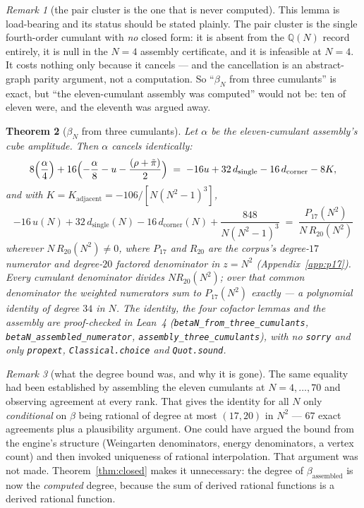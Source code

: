 \documentclass[11pt]{article}
\newtheorem{theorem}{Theorem}[section]
\theoremstyle{definition}
\theoremstyle{remark}
\newtheorem{remark}[theorem]{Remark}
\newcommand{\Q}{\mathbb{Q}}
\newcommand{\chk}[1]{}
\begin{document}
\begin{remark}[the pair cluster is the one that is never computed]
This lemma is load-bearing and its status should be stated plainly. The pair
cluster is the single fourth-order cumulant with \emph{no} closed form: it is
absent from the $\Q(N)$ record entirely, it is null in the $N=4$ assembly
certificate, and it is infeasible at $N=4$. It costs nothing only because it
cancels --- and the cancellation is an abstract-graph parity argument, not a
computation. So ``$\beta_N$ from three cumulants'' is exact, but ``the
eleven-cumulant assembly was computed'' would not be: ten of eleven were, and
the eleventh was argued away.
\end{remark}

\begin{theorem}[$\beta_N$ from three cumulants]\label{thm:beta}
Let $\alpha$ be the eleven-cumulant assembly's cube amplitude. Then $\alpha$
cancels identically:
\[
  8\Bigl(\frac{\alpha}{4}\Bigr)
  +16\Bigl(-\frac{\alpha}{8}-u-\frac{(\rho+\tilde\pi)}{2}\Bigr)
  \;=\;-16u+32\,d_{\mathrm{single}}-16\,d_{\mathrm{corner}}-8K ,
\]
and with $K=K_{\mathrm{adjacent}}=-106/[N(N^2-1)^3]$,
\begin{equation}\label{eq:betaid}
  -16\,u(N)+32\,d_{\mathrm{single}}(N)-16\,d_{\mathrm{corner}}(N)
  +\frac{848}{N(N^2-1)^3}
  \;=\;\frac{P_{17}(N^2)}{N\,R_{20}(N^2)}
\end{equation}
wherever $N\,R_{20}(N^2)\ne0$, where $P_{17}$ and $R_{20}$ are the corpus's
degree-$17$ numerator and degree-$20$ factored denominator in $z=N^2$
(Appendix~\ref{app:p17}). Every cumulant denominator divides $NR_{20}(N^2)$;
over that common denominator the weighted numerators sum to $P_{17}(N^2)$
exactly --- a polynomial identity of degree $34$ in $N$. The identity, the four
cofactor lemmas and the assembly are proof-checked in Lean~4
(\texttt{betaN\_from\_three\_cumulants}, \texttt{betaN\_assembled\_numerator},
\texttt{assembly\_three\_cumulants}), with no \texttt{sorry} and only
\texttt{propext}, \texttt{Classical.choice} and \texttt{Quot.sound}.\chk{the final polynomial identity: -16 u + 32 d - 16 corner - 8 K\_adj = P17(N\^{}2)/(N R20(N\^{}2)) as rational functions, for the closed forms of the two-hop weight, the single-contact dressing, the corner dressing and the adjacent-face cube completion}
\end{theorem}

\begin{remark}[what the degree bound was, and why it is gone]
The same equality had been established by assembling the eleven cumulants at
$N=4,\dots,70$ and observing agreement at every rank. That gives the identity
for all $N$ only \emph{conditional} on $\beta$ being rational of degree at most
$(17,20)$ in $N^2$ --- $67$ exact agreements plus a plausibility argument. One
could have argued the bound from the engine's structure (Weingarten
denominators, energy denominators, a vertex count) and then invoked uniqueness
of rational interpolation. That argument was not made. Theorem~\ref{thm:closed}
makes it unnecessary: the degree of $\beta_{\mathrm{assembled}}$ is now the
\emph{computed} degree, because the sum of derived rational functions is a
derived rational function.
\end{remark}
\end{document}
